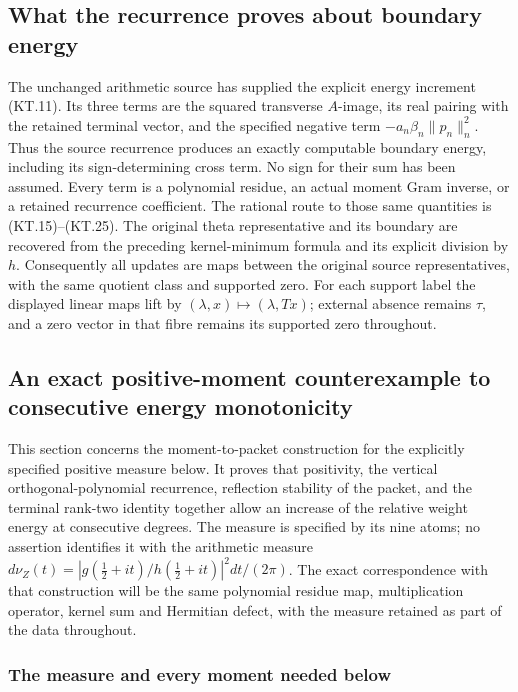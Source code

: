 \subsection{What the recurrence proves about boundary energy}

The unchanged arithmetic source has supplied the explicit energy
increment (KT.11).  Its three terms are the squared transverse
\(A\)-image, its real pairing with the retained terminal vector,
and the specified negative term \(-a_n\beta_n\|p_n\|_n^2\).
Thus the source recurrence produces an exactly computable boundary
energy, including its sign-determining cross term.  No sign for
their sum has been assumed.  Every term is a polynomial residue,
an actual moment Gram inverse, or a retained recurrence coefficient.
The rational route to those same quantities is (KT.15)--(KT.25).
The original theta representative and its boundary are recovered
from the preceding kernel-minimum formula and its explicit division
by \(h\).  Consequently all updates are maps between the original
source representatives, with the same quotient class and supported
zero.  For each support label the displayed linear maps lift by
\((\lambda,x)\mapsto(\lambda,Tx)\); external absence remains
\(\tau\), and a zero vector in that fibre remains its supported
zero throughout.

\subsection{An exact positive-moment counterexample to consecutive energy monotonicity}
\label{sec:terminal-energy-counterexample}

This section concerns the moment-to-packet construction for the explicitly
specified positive measure below.  It proves that positivity, the vertical
orthogonal-polynomial recurrence, reflection stability of the packet, and
the terminal rank-two identity together allow an increase of the relative
weight energy at consecutive degrees.  The measure is specified by its nine
atoms; no assertion identifies it with the arithmetic measure
\(d\nu_Z(t)=|g(\tfrac12+it)/h(\tfrac12+it)|^2dt/(2\pi)\).
The exact correspondence with that construction will be the same polynomial
residue map, multiplication operator, kernel sum and Hermitian defect, with
the measure retained as part of the data throughout.

\subsubsection{The measure and every moment needed below}

